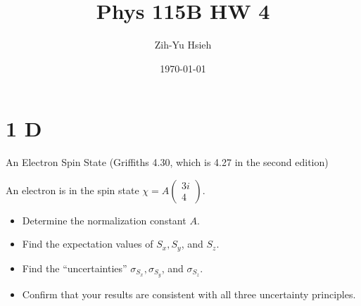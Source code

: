 \documentclass{article}
\title{Phys 115B HW 4}
\author{Zih-Yu Hsieh}
\date{\today}
\begin{document}
\maketitle

\section*{1 D} 
\begin{ques}\label{q1}
An Electron Spin State (Griffiths 4.30, which is 4.27 in the second edition)

An electron is in the spin state $\chi = A\begin{pmatrix}
    3i\\4
\end{pmatrix}$.

\begin{itemize}
    \item[(a)] Determine the normalization constant $A$.
    \item[(b)] Find the expectation values of $S_x, S_y$, and $S_z$.
    \item[(c)] Find the ``uncertainties'' $\sigma_{S_x}, \sigma_{S_y}$, and $\sigma_{S_z}$.
    \item[(d)] Confirm that your results are consistent with all three uncertainty principles. 
\end{itemize}
\end{ques}
\end{document}
